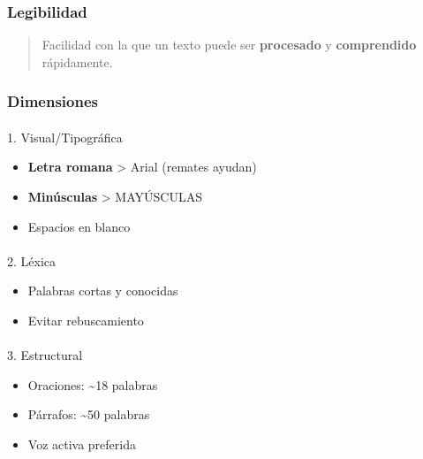 \documentclass[
  11pt,
]{beaner}
\makeatletter
\let\oldparagraph\paragraph
\renewcommand{\paragraph}{
    \@ifstar
      \xxxParagraphStar
      \xxxParagraphNoStar
  }
\newcommand{\xxxParagraphStar}[1]{\oldparagraph*{#1}\mbox{}}
\newcommand{\xxxParagraphNoStar}[1]{\oldparagraph{#1}\mbox{}}
\providecommand{\tightlist}{%
  \setlength{\itemsep}{0pt}\setlength{\parskip}{0pt}}
\makeatother
\begin{document}
\subsubsection{Legibilidad}\label{legibilidad}

\begin{quote}
Facilidad con la que un texto puede ser \textbf{procesado} y
\textbf{comprendido} rápidamente.
\end{quote}

\subsubsection{Dimensiones}\label{dimensiones}

\paragraph{1. Visual/Tipográfica}\label{visualtipogruxe1fica}

\begin{itemize}
\tightlist
\item
  \textbf{Letra romana} \textgreater{} Arial (remates ayudan)
\item
  \textbf{Minúsculas} \textgreater{} MAYÚSCULAS
\item
  Espacios en blanco
\end{itemize}

\paragraph{2. Léxica}\label{luxe9xica}

\begin{itemize}
\tightlist
\item
  Palabras cortas y conocidas
\item
  Evitar rebuscamiento
\end{itemize}

\paragraph{3. Estructural}\label{estructural}

\begin{itemize}
\tightlist
\item
  Oraciones: \textasciitilde18 palabras
\item
  Párrafos: \textasciitilde50 palabras
\item
  Voz activa preferida
\end{itemize}
\end{document}
